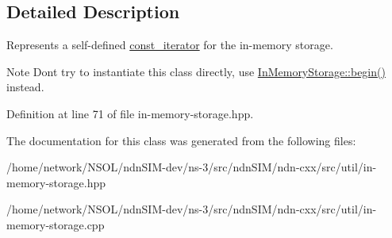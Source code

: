 \subsection{Detailed Description}
Represents a self-\/defined \hyperlink{classndn_1_1util_1_1InMemoryStorage_1_1const__iterator}{const\+\_\+iterator} for the in-\/memory storage. 

\begin{DoxyNote}{Note}
Don\textquotesingle{}t try to instantiate this class directly, use \hyperlink{classndn_1_1util_1_1InMemoryStorage_acaf639e8e935d28d7e02cc1186c84ba2}{In\+Memory\+Storage\+::begin()} instead. 
\end{DoxyNote}


Definition at line 71 of file in-\/memory-\/storage.\+hpp.



The documentation for this class was generated from the following files\+:\begin{DoxyCompactItemize}
\item 
/home/network/\+N\+S\+O\+L/ndn\+S\+I\+M-\/dev/ns-\/3/src/ndn\+S\+I\+M/ndn-\/cxx/src/util/in-\/memory-\/storage.\+hpp\item 
/home/network/\+N\+S\+O\+L/ndn\+S\+I\+M-\/dev/ns-\/3/src/ndn\+S\+I\+M/ndn-\/cxx/src/util/in-\/memory-\/storage.\+cpp\end{DoxyCompactItemize}
